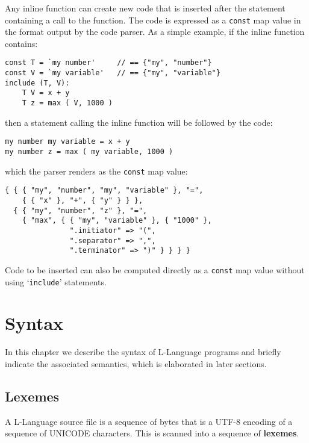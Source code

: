 \documentclass[12pt]{article}
\newcommand{\skey}[2]{{\rm \bfseries #1#2}}
\newenvironment{indpar}[1][0.3in]%
	{\begin{list}{}%
		     {\setlength{\itemsep}{0in}%
		      \setlength{\topsep}{0in}%
		      \setlength{\parsep}{1ex}%
		      \setlength{\labelwidth}{#1}%
		      \setlength{\leftmargin}{#1}%
		      \addtolength{\leftmargin}{\labelsep}}%
	 \item}%
	{\end{list}}
\begin{document}
Any inline function can create new code that is inserted
after the statement containing a call to the function.
The code is expressed as a {\tt const} map value in
the format output by the code parser.  As a simple
example, if the inline function contains:
\begin{indpar}\begin{verbatim}
const T = `my number'     // == {"my", "number"}
const V = `my variable'   // == {"my", "variable"}
include (T, V):
    T V = x + y
    T z = max ( V, 1000 )
\end{verbatim}\end{indpar}
then a statement calling the inline function will be
followed by the code:
\begin{indpar}\begin{verbatim}
my number my variable = x + y
my number z = max ( my variable, 1000 )
\end{verbatim}\end{indpar}
which the parser renders as the {\tt const} map value:
\begin{indpar}\begin{verbatim}
{ { { "my", "number", "my", "variable" }, "=",
    { { "x" }, "+", { "y" } } },
  { { "my", "number", "z" }, "=",
    { "max", { { "my", "variable" }, { "1000" },
               ".initiator" => "(",
               ".separator" => ",",
               ".terminator" => ")" } } } }
\end{verbatim}\end{indpar}

Code to be inserted can also be computed directly as a {\tt const} map
value without using `{\tt include}' statements.




\section{Syntax}

In this chapter we describe the syntax of L-Language programs
and briefly indicate the associated semantics, which is
elaborated in later sections.

\subsection{Lexemes}
\label{LEXEMES}

A L-Language source file is a sequence of bytes that is a UTF-8 encoding
of a sequence of UNICODE characters.  This is scanned into a sequence
of \skey{lexeme}s.
\end{document}
